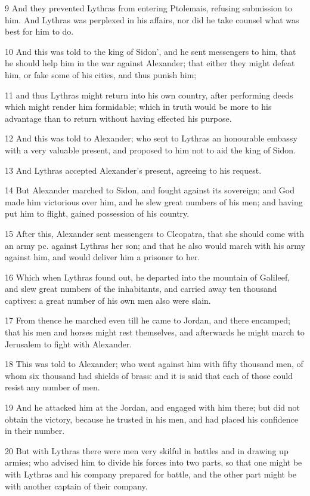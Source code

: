 9 And they prevented Lythras from entering Ptolemais, refusing submission to him. And Lythras was perplexed in his affairs, nor did he take counsel what was best for him to do. 

10 And this was told to the king of Sidon’, and he sent messengers to him, that he should help him in the war against Alexander; that either they might defeat him, or fake some of his cities, and thus punish him; 

11 and thus Lythras might return into his own country, after performing deeds which might render him formidable; which in truth would be more to his advantage than to return without having effected his purpose. 

12 And this was told to Alexander; who sent to Lythras an honourable embassy with a very valuable present, and proposed to him not to aid the king of Sidon. 

13 And Lythras accepted Alexander’s present, agreeing to his request. 

14 But Alexander marched to Sidon, and fought against its sovereign; and God made him victorious over him, and he slew great numbers of his men; and having put him to flight, gained possession of his country. 

15 After this, Alexander sent messengers to Cleopatra, that she should come with an army pc. against Lythras her son; and that he also would march with his army against him, and would deliver him a prisoner to her. 

16 Which when Lythras found out, he departed into the mountain of Galileef, and slew great numbers of the inhabitants, and carried away ten thousand captives: a great number of his own men also were slain. 

17 From thence he marched even till he came to Jordan, and there encamped; that his men and horses might rest themselves, and afterwards he might march to Jerusalem to fight with Alexander. 

18 This was told to Alexander; who went against him with fifty thousand men, of whom six thousand had shields of brass: and it is said that each of those could resist any number of men. 

19 And he attacked him at the Jordan, and engaged with him there; but did not obtain the victory, because he trusted in his men, and had placed his confidence in their number. 

20 But with Lythras there were men very skilful in battles and in drawing up armies; who advised him to divide his forces into two parts, so that one might be with Lythras and his company prepared for battle, and the other part might be with another captain of their company. 

